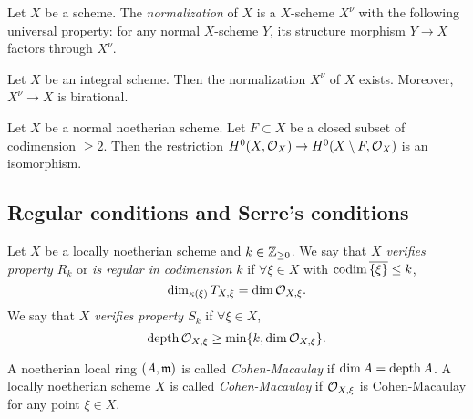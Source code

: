     \begin{example}
        
    \end{example}

    \begin{definition}
        Let $X$ be a scheme.
        The \textit{normalization} of $X$ is a $X$-scheme $X^\nu$ with the following universal property:
        for any normal $X$-scheme $Y$, its structure morphism $Y \to X$ factors through $X^\nu$.
    \end{definition}

    \begin{proposition}
        Let $X$ be an integral scheme.
        Then the normalization $X^\nu$ of $X$ exists.
        Moreover, $X^\nu \to X$ is birational.
    \end{proposition}

    \begin{theorem}
        Let $X$ be a normal noetherian scheme.
        Let $F \subset X$ be a closed subset of codimension $\geq 2$.
        Then the restriction $H^0(X,\mathcal{O}_X) \to H^0(X\setminus F, \mathcal{O}_{X})$ is an isomorphism.
    \end{theorem}


    
\subsection{Regular conditions and Serre's conditions}

    \begin{definition}
        Let $X$ be a locally noetherian scheme and $k \in \mathbb{Z}_{\geq 0}$.
        We say that \textit{$X$ verifies property $R_k$} or \textit{is regular in codimension $k$} if $\forall \xi \in X$ with $\operatorname{codim} \overline{\{\xi\}} \leq k$, 
        \[ \dim_{\kappa(\xi)} T_{X,\xi} = \dim \mathcal{O}_{X,\xi}. \]
        We say that \textit{$X$ verifies property $S_k$} if $\forall \xi \in X$,
        \[ \operatorname{depth} \mathcal{O}_{X,\xi} \geq \min\{k, \dim \mathcal{O}_{X,\xi}\}. \]        
    \end{definition}

    \begin{definition}
        A noetherian local ring $(A,\mathfrak{m})$ is called \textit{Cohen-Macaulay} if $\dim A = \operatorname{depth} A$.
        A locally noetherian scheme $X$ is called \textit{Cohen-Macaulay} if $\mathcal{O}_{X,\xi}$ is Cohen-Macaulay for any point $\xi \in X$.
    \end{definition}

